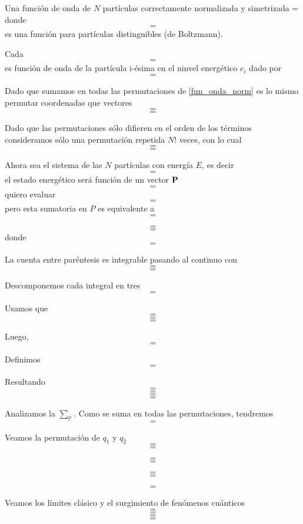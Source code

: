 \documentclass[10pt,oneside]{CBFT_book}
\begin{document}
Una función de onda de $N$ partículas correctamente normalizada y simetrizada
\be
	=
	\label{fun_onda_norm}
\ee
{}
donde 
\[
	=
\]
es una función para partículas distinguibles (de Boltzmann).

Cada
\[
	=
\]
es función de onda de la partícula i-ésima en el ninvel energético $e_i$ dado por 
\[
	=
\]

Dado que sumamos en todas las permutaciones de \eqref{fun_onda_norm} es lo mismo permutar coordenadas que vectores
\[
	=
\]
\[
	=
\]

Dado que las permutaciones sólo difieren en el orden de los términos consideramos sólo una permutación repetida $N!$ 
veces, con lo cual 
\[
	=
\]
\[
	=
\]
\notamargen{
\[
	\delta \mathbb{P} = \begin{cases}
	                     1 \qquad \text{ bosones } \\
	                     \pm 1 \qquad \text{ fermiones}\\
	                     \text{ (perm par o impar) }
	                    \end{cases}
\]}

Ahora sea el sistema de las $N$ partículas con energía $E$, es decir 
\[
	=
\]
el estado energético será función de un vector $\vb{P}$
\[
	=
\]
quiero evaluar 
\[
	=
\]
pero esta sumatoria en $P$ es equivalente a 
\[
	=
\]

\[
	=
\]
\[
	=
\]
donde 
\[
	=
\]

La cuenta entre paréntesis es integrable pasando al continuo con 
\[
	=
\]
\[
	=
\]

Descomponemos cada integral en tres
\[
	=
\]

Usamos que 
\[
	=
\]
\[
	=
\]
\[
	=
\]

Luego,
\[
	=
\]

Definimos
\[
	=
\]

Resultando 
\[
	=
\]
\[
	=
\]
\[
	=
\]
\[
	=
\]

Analizamos la $\sum_{\mathbb{P}}$. Como se suma en todas las permutaciones, tendremos
\[
	=
\]

Veamos la permutación de $q_1$ y $q_2$
\[
	=
\]
\[
	=
\]

\[
	=
\]
\[
	=
\]

\[
	=
\]
\[
	=
\]

\[
	=
\]

Veamos los límites clásico y el surgimiento de fenómenos cuánticos 
\[
	=
\]
\[
	=
\]
\[
	=
\]
\[
	=
\]
\end{document}
